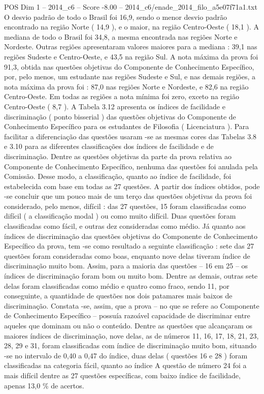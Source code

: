 \begin{textsample}{POS Dim 1 – 2014\_c6 – Score -8.00 – 2014\_c6/enade\_2014\_filo\_a5e07f71a1.txt}
O desvio padrão de todo o Brasil foi 16,9, sendo o menor desvio padrão encontrado na região Norte ( 14,9 ), e o maior, na região Centro-Oeste ( 18,1 ).
A mediana de todo o Brasil foi 34,8, a mesma encontrada nas regiões Norte e Nordeste.
Outras regiões apresentaram valores maiores para a mediana : 39,1 nas regiões Sudeste e Centro-Oeste, e 43,5 na região Sul.
A nota máxima da prova foi 91,3, obtida nas questões objetivas do Componente de Conhecimento Específico, por, pelo menos, um estudante nas regiões Sudeste e Sul, e nas demais regiões, a nota máxima da prova foi : 87,0 nas regiões Norte e Nordeste, e 82,6 na região Centro-Oeste.
Em todas as regiões a nota mínima foi zero, exceto na região Centro-Oeste ( 8,7 ).
A Tabela 3.12 apresenta os índices de facilidade e discriminação ( ponto bisserial ) das questões objetivas do Componente de Conhecimento Específico para os estudantes de Filosofia ( Licenciatura ).
Para facilitar a diferenciação das questões usaram -se as mesmas cores das Tabelas 3.8 e 3.10 para as diferentes classificações dos índices de facilidade e de discriminação.
Dentre as questões objetivas da parte da prova relativa ao Componente de Conhecimento Específico, nenhuma das questões foi anulada pela Comissão.
Desse modo, a classificação, quanto ao índice de facilidade, foi estabelecida com base em todas as 27 questões.
A partir dos índices obtidos, pode -se concluir que um pouco mais de um terço das questões objetivas da prova foi considerado, pelo menos, difícil : das 27 questões, 15 foram classificadas como difícil ( a classificação modal ) ou como muito difícil.
Duas questões foram classificadas como fácil, e outras dez consideradas como médio.
Já quanto aos índices de discriminação das questões objetivas do Componente de Conhecimento Específico da prova, tem -se como resultado a seguinte classificação : sete das 27 questões foram consideradas como boas, enquanto nove delas tiveram índice de discriminação muito bom.
Assim, para a maioria das questões – 16 em 25 – os índices de discriminação foram bom ou muito bom.
Dentre as demais, outras sete delas foram classificadas como médio e quatro como fraco, sendo 11, por conseguinte, a quantidade de questões nos dois patamares mais baixos de discriminação.
Constata -se, assim, que a prova – no que se refere ao Componente de Conhecimento Específico – possuía razoável capacidade de discriminar entre aqueles que dominam ou não o conteúdo.
Dentre as questões que alcançaram os maiores índices de discriminação, nove delas, as de números 11, 16, 17, 18, 21, 23, 28, 29 e 31, foram classificadas com índice de discriminação muito bom, situando -se no intervalo de 0,40 a 0,47 do índice, duas delas ( questões 16 e 28 ) foram classificadas na categoria fácil, quanto ao índice A questão de número 24 foi a mais difícil dentre as 27 questões específicas, com baixo índice de facilidade, apenas 13,0 \% de acertos.

\end{textsample}
